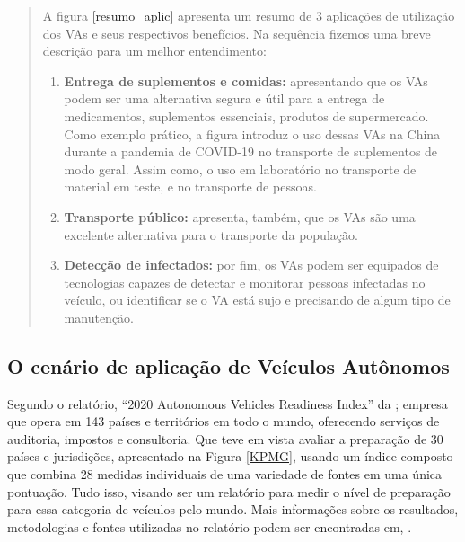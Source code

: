 \begin{quote}

A figura \ref{resumo_aplic} apresenta um resumo de 3 aplicações de utilização dos VAs e seus respectivos benefícios. Na sequência fizemos uma breve descrição para um melhor entendimento:

\begin{enumerate}
 \item \textbf{Entrega de suplementos e comidas:} apresentando que os VAs podem ser uma alternativa segura e útil para a entrega de medicamentos, suplementos essenciais, produtos de supermercado. Como exemplo prático, a figura introduz o uso dessas VAs na China durante a pandemia de COVID-19 no transporte de suplementos de modo geral. Assim como, o uso em laboratório no transporte de material em teste, e no transporte de pessoas.

\item \textbf{Transporte público:} apresenta, também, que os VAs são uma excelente alternativa para o transporte da população. 

\item \textbf{Detecção de infectados:} por fim, os VAs podem ser equipados de tecnologias capazes de detectar e monitorar pessoas infectadas no veículo, ou identificar se o VA está sujo e precisando de algum tipo de manutenção. 

\end{enumerate}

\end{quote}

\subsection{O cenário de aplicação de Veículos Autônomos}
Segundo o relatório, “2020 Autonomous Vehicles Readiness Index” da \cite{KPMG}; empresa que opera em 143 países e territórios em todo o mundo, oferecendo serviços de auditoria, impostos e consultoria.
Que teve em vista avaliar a preparação de 30 países e jurisdições, apresentado na Figura \ref{KPMG}, usando um índice composto que combina 28 medidas individuais de uma variedade de fontes em uma única pontuação. Tudo isso, visando ser um relatório para medir o nível de preparação para essa categoria de veículos pelo mundo. Mais informações sobre os resultados, metodologias e fontes utilizadas no relatório podem ser encontradas em, \cite{KPMG}.

